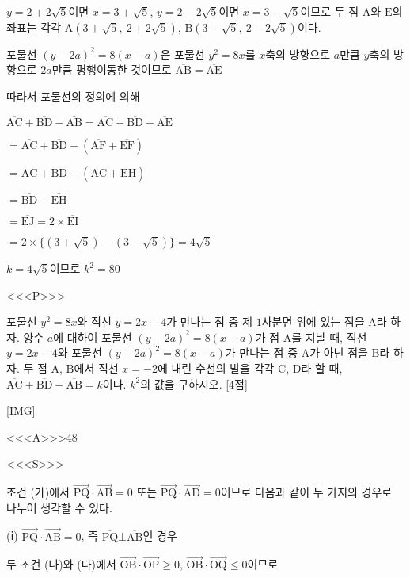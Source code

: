 \documentclass{oblivoir}
\begin{document}
$y=2+2\sqrt{5}$이면 $x=3+\sqrt{5}$, $y=2-2\sqrt{5}$이면 $x=3-\sqrt{5}$이므로 두 점 $\mathrm{A}$와 $\mathrm{E}$의 좌표는 각각 $\mathrm{A}(3+\sqrt{5},\:2+2\sqrt{5})$, $\mathrm{B}(3-\sqrt{5},\:2-2\sqrt{5})$이다.

포물선 $(y-2a)^{2}= 8(x- a)$은 포물선 $y^{2}= 8x$를 $x$축의 방향으로 $a$만큼 $y$축의 방향으로 $2a$만큼 평행이동한 것이므로 $\overline{\mathrm{AB}} =\overline{\mathrm{AE}}$

따라서 포물선의 정의에 의해 

$\overline{\mathrm{AC}}+\overline{\mathrm{BD}}-\overline{\mathrm{AB}}$$=\overline{\mathrm{AC}} +\overline{\mathrm{BD}} -\overline{\mathrm{AE}}$

$=\overline{\mathrm{AC}} +\overline{\mathrm{BD}} -(\overline{\mathrm{AF}} +\overline{\mathrm{EF}})$

$=\overline{\mathrm{AC}} +\overline{\mathrm{BD}} -(\overline{\mathrm{AC}} +\overline{\mathrm{EH}})$

$=\overline{\mathrm{BD}} -\overline{\mathrm{EH}}$

$=\overline{\mathrm{EJ}}$$= 2\times\overline{\mathrm{EI}}$

$=2\times\{(3+\sqrt{5})-(3-\sqrt{5})\}$$=4\sqrt{5}$

$k=4\sqrt{5}$이므로 $k^{2}= 80$

<<<P>>>

포물선 $y^{2}= 8x$와 직선 $y = 2x - 4$가 만나는 점 중 제 $1$사분면 위에 있는 점을 $\mathrm{A}$라 하자. 양수 $a$에 대하여 포물선 $(y-2a)^{2}= 8(x- a)$가 점 $\mathrm{A}$를 지날 때, 직선 $y = 2x - 4$와 포물선 $(y-2a)^{2}= 8(x-a)$가 만나는 점 중 $\mathrm{A}$가 아닌 점을 $\mathrm{B}$라 하자. 두 점 $\mathrm{A}$, $\mathrm{B}$에서 직선 $x = -2$에 내린 수선의 발을 각각 $\mathrm{C}$, $\mathrm{D}$라 할 때, $\overline{\mathrm{AC}}+\overline{\mathrm{BD}}-\overline{\mathrm{AB}}= k$이다. $k^{2}$의 값을 구하시오. [4점]

[IMG]

<<<A>>>$48$

<<<S>>>

조건 (가)에서 $\overrightarrow{\mathrm{PQ}}\cdot\overrightarrow{\mathrm{AB}} = 0$ 또는 $\overrightarrow{\mathrm{PQ}}\cdot\overrightarrow{\mathrm{AD}} = 0$이므로 다음과 같이 두 가지의 경우로 나누어 생각할 수 있다. 

(ⅰ) $\overrightarrow{\mathrm{PQ}}\cdot\overrightarrow{\mathrm{AB}} = 0$, 즉 $\overline{\mathrm{PQ}}\bot\overline{\mathrm{AB}}$인 경우

두 조건 (나)와 (다)에서 $\overrightarrow{\mathrm{OB}}\cdot\overrightarrow{\mathrm{OP}}\ge 0$, $\overrightarrow{\mathrm{OB}}\cdot\overrightarrow{\mathrm{OQ}}\le 0$이므로
\end{document}
